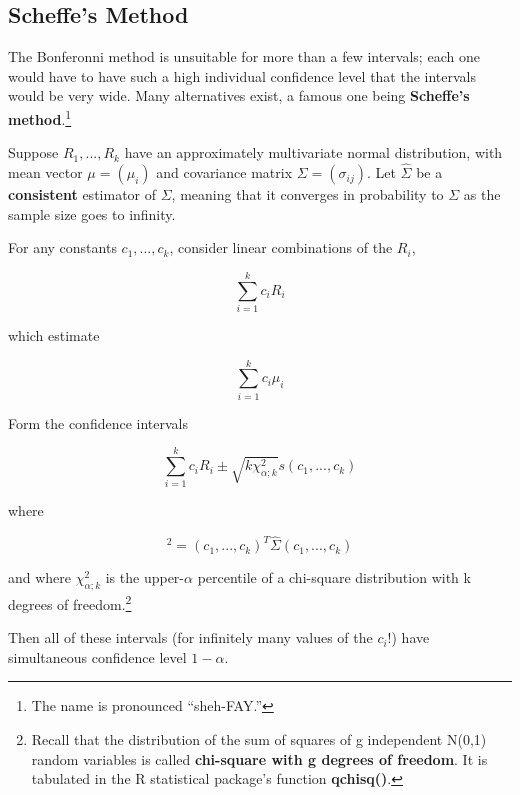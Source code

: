 \subsection{Scheffe's Method}
\label{scheffe}

The Bonferonni method is unsuitable for more than a few intervals; each
one would have to have such a high individual confidence level that the
intervals would be very wide.  Many alternatives exist, a famous one
being {\bf Scheffe's method}.\footnote{The name is pronounced
``sheh-FAY.''}

\begin{theorem}

Suppose $R_1,...,R_k$ have an approximately multivariate normal
distribution, with mean vector $\mu = (\mu_i)$ and covariance matrix
$\Sigma = (\sigma_{ij})$.  Let $\widehat{\Sigma}$ be a {\bf consistent}
estimator of $\Sigma$, meaning that it converges in probability to
$\Sigma$ as the sample size goes to infinity.

For any constants $c_1,...,c_k$, consider linear combinations of the
$R_i$, 

\begin{equation}
\label{lincomb}
\sum_{i=1}^{k} c_i R_i
\end{equation}

which estimate

\begin{equation}
\sum_{i=1}^{k} c_i \mu_i
\end{equation}

Form the confidence intervals 

\begin{equation}
\label{radius}
\sum_{i=1}^{k} c_i R_i \pm 
\sqrt{k \chi_{\alpha; k}^2} s(c_1,...,c_k)
\end{equation}

where

\begin{equation}
[s(c_1,...,c_k)]^2 = (c_1,...,c_k)^T \widehat{\Sigma} (c_1,...,c_k)
\end{equation}

and where $\chi_{\alpha; k}^2$ is the upper-$\alpha$ percentile of a
chi-square distribution with k degrees of freedom.\footnote{Recall
that the distribution of the sum of squares of g independent N(0,1)
random variables is called {\bf chi-square with g degrees of freedom}.
It is tabulated in the R statistical package's function {\bf qchisq()}.}

Then all of these intervals (for infinitely many values of the $c_i$!)
have simultaneous confidence level $1-\alpha$.

\end{theorem}

